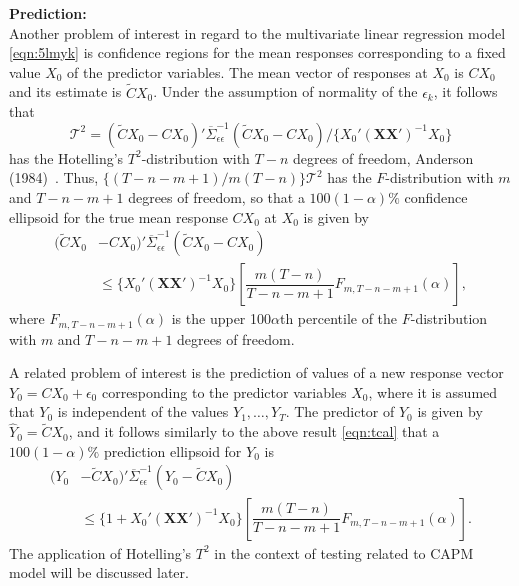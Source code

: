 \noindent \textbf{Prediction:} \\


Another problem of interest in regard to the multivariate linear regression model \eqref{eqn:5lmyk} is confidence regions for the mean responses corresponding to a fixed value $X_0$ of the predictor variables. The mean vector of responses at $X_0$ is $CX_0$ and its estimate is $\tilde{C}X_0$. Under the assumption of normality of the $\epsilon_k$, it follows that
	\begin{equation} \label{eqn:tcal}
	\mathcal{T}^2= ( \tilde{C }X_0 - CX_0)' \overline{\Sigma}_{\epsilon\epsilon}^{-1} (\tilde{C} X_0 - CX_0) / \{X_0'(\mathbf{X} \mathbf{X}')^{-1}X_0 \}
	\end{equation}
has the Hotelling's $T^2$-distribution with $T - n$ degrees of freedom, Anderson (1984)~\cite[Chap. 5]{andersontw2}. Thus, $\{(T - n - m + 1)/ m(T - n)\} \mathcal{T}^2$ has the $F$-distribution with $m$ and $T - n - m + 1$ degrees of freedom, so that a $100(1 - \alpha)\%$ confidence ellipsoid for the true mean response $CX_0$ at $X_0$ is given by 
	\begin{equation} \label{eqn:52line}
	\begin{split}
	(\tilde{C}X_0 & -CX_0)' \overline{\Sigma}_{\epsilon\epsilon}^{-1} (\tilde{C}X_0 - CX_0) \\
	&\leq \{X_0' (\mathbf{X}\mathbf{X}')^{-1} X_0\} \left[ \dfrac{m(T - n)}{T - n - m + 1} F_{m,T - n - m + 1}(\alpha) \right],
	 \end{split}
	\end{equation}
where $F_{m,T - n - m + 1}(\alpha)$ is the upper 100$\alpha$th percentile of the $F$-distribution with $m$ and $T - n - m + 1$ degrees of freedom. 


A related problem of interest is the prediction of values of a new response vector $Y_0= CX_0 + \epsilon_0$ corresponding to the predictor variables $X_0$, where it is assumed that $Y_0$ is independent of the values $Y_1, \ldots, Y_T$. The predictor of $Y_0$ is given by $\hat{Y}_0= \tilde{C}X_0$, and it follows similarly to the above result \eqref{eqn:tcal} that a $100(1 - \alpha)\%$ prediction ellipsoid for $Y_0$ is
	\begin{equation} \label{eqn:52another2}
	\begin{split}
	(Y_0 & -\tilde{C}X_0)' \overline{\Sigma}_{\epsilon\epsilon}^{-1} (Y_0 - \tilde{C} X_0) \\
	&\leq \{1 + X_0'(\mathbf{X}\mathbf{X}')^{-1} X_0\} \left[ \dfrac{m(T - n)}{T - n - m + 1} F_{m,T - n - m + 1}(\alpha) \right].
	\end{split}
	\end{equation}
The application of Hotelling's $T^2$ in the context of testing related to CAPM model will be discussed later.



